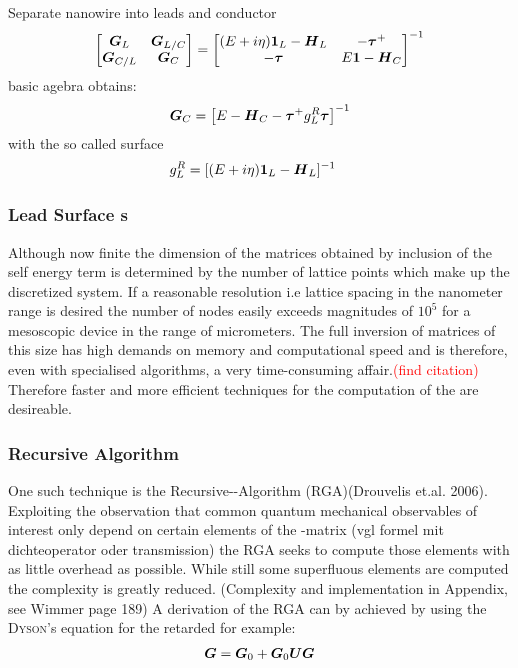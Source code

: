 Separate nanowire into leads and conductor
\begin{align}
  \begin{bmatrix}
  \boldsymbol{G}_{L} & \boldsymbol{G}_{L/C}\\
  \boldsymbol{G}_{C/L} & \boldsymbol{G}_{C}
  \end{bmatrix}
  =
  \begin{bmatrix}
  (E+i\eta)\boldsymbol{1}_{L} - \boldsymbol{H}_L  & -\boldsymbol{\tau}^+ \\
	-\boldsymbol{\tau} & E\boldsymbol{1} - \boldsymbol{H}_C
  \end{bmatrix}^{-1}
  \label{green divided}
\end{align}
basic agebra obtains:
\begin{align}
\boldsymbol{G}_C& = \left[E-\boldsymbol{H}_C - \boldsymbol{\tau}^+ g_L^R \boldsymbol{\tau}\right]^{-1} \\
\end{align}
with the so called surface \gfnc
\begin{align}
g_L^R &= [(E+i\eta)\boldsymbol{1}_L - \boldsymbol{H}_L]^{-1}
\end{align}
\subsubsection{Lead Surface \gfnc s}
Although now finite the dimension of the matrices obtained by inclusion of the self energy term is determined by the number of lattice points which make up the discretized system.
If a reasonable resolution i.e lattice spacing in the nanometer range is desired the number of nodes easily exceeds magnitudes of $10^5$ for a mesoscopic device in the range of micrometers. 
The full inversion of matrices of this size has high demands on memory and computational speed and is therefore, even with specialised algorithms, a very time-consuming affair.\textcolor{red}{(find citation)}
Therefore faster and more efficient techniques for the computation of the \gfnc{} are desireable.
\subsubsection{Recursive \gfnc{} Algorithm}
One such technique is the Recursive-\gfnc-Algorithm (RGA)(Drouvelis et.al. 2006)\cite{MacKinnon1985}. Exploiting the observation that common quantum mechanical observables of interest only depend on certain elements of the \gfnc-matrix (vgl formel mit dichteoperator oder transmission) the RGA seeks to compute those elements with as little overhead as possible. While still some superfluous elements are computed the complexity is greatly reduced. (Complexity and implementation in Appendix, see Wimmer page 189) 
A derivation of the RGA can by achieved by using the \textsc{Dyson}'s equation for the retarded \gfnc{} for example:
\begin{align}
	\boldsymbol{G} = \boldsymbol{G}_0+\boldsymbol{G}_0\boldsymbol{U}\boldsymbol{G}
	\label{eqn:DysonEquationG}
\end{align}

